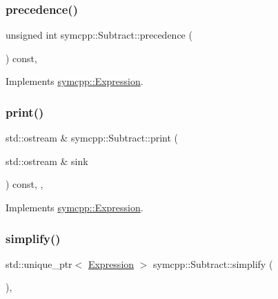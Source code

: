 \subsubsection{\texorpdfstring{precedence()}{precedence()}}
{\footnotesize\ttfamily unsigned int symcpp\+::\+Subtract\+::precedence (\begin{DoxyParamCaption}{ }\end{DoxyParamCaption}) const\hspace{0.3cm}{\ttfamily [override]}, {\ttfamily [virtual]}}



Implements \mbox{\hyperlink{classsymcpp_1_1Expression_a181c162d5740faac392ffdca26bfca0c}{symcpp\+::\+Expression}}.

\mbox{\label{classsymcpp_1_1Subtract_a7f0af9519d3a4978abf85e88da7d682d}} 
\subsubsection{\texorpdfstring{print()}{print()}}
{\footnotesize\ttfamily std\+::ostream \& symcpp\+::\+Subtract\+::print (\begin{DoxyParamCaption}\item[{std\+::ostream \&}]{sink }\end{DoxyParamCaption}) const\hspace{0.3cm}{\ttfamily [override]}, {\ttfamily [private]}, {\ttfamily [virtual]}}



Implements \mbox{\hyperlink{classsymcpp_1_1Expression_af37e13032a40f2da4d2866eaa8658049}{symcpp\+::\+Expression}}.

\mbox{\label{classsymcpp_1_1Subtract_a3d3b5586c41dbbee1071a08db5725ecc}} 
\subsubsection{\texorpdfstring{simplify()}{simplify()}}
{\footnotesize\ttfamily std\+::unique\+\_\+ptr$<$ \mbox{\hyperlink{classsymcpp_1_1Expression}{Expression}} $>$ symcpp\+::\+Subtract\+::simplify (\begin{DoxyParamCaption}{ }\end{DoxyParamCaption})\hspace{0.3cm}{\ttfamily [override]}, {\ttfamily [virtual]}}



